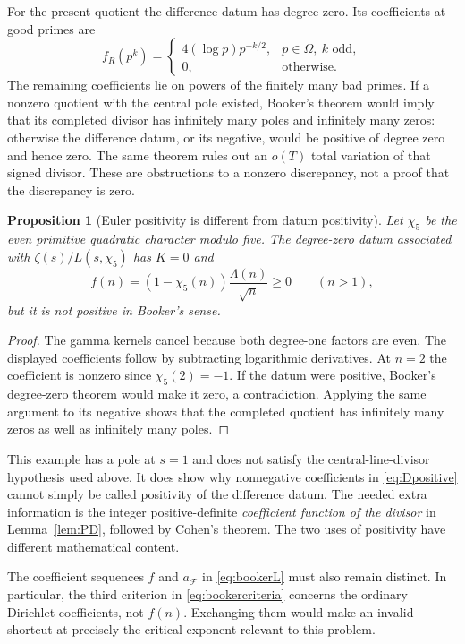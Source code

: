 \documentclass[11pt]{article}
\newtheorem{proposition}[theorem]{Proposition}
\theoremstyle{definition}
\theoremstyle{remark}
\numberwithin{equation}{section}
\begin{document}
For the present quotient the difference datum has degree zero. Its coefficients at good primes are
\[
f_R(p^k)=
\begin{cases}
4(\log p)p^{-k/2},&p\in\Omega,\ k\text{ odd},\\
0,&\text{otherwise}.
\end{cases}
\]
The remaining coefficients lie on powers of the finitely many bad primes. If a nonzero quotient with the central pole existed, Booker's theorem would imply that its completed divisor has infinitely many poles and infinitely many zeros: otherwise the difference datum, or its negative, would be positive of degree zero and hence zero. The same theorem rules out an $o(T)$ total variation of that signed divisor. These are obstructions to a nonzero discrepancy, not a proof that the discrepancy is zero.

\begin{proposition}[Euler positivity is different from datum positivity]\label{prop:counterexample}
Let $\chi_5$ be the even primitive quadratic character modulo five. The degree-zero datum associated with $\zeta(s)/L(s,\chi_5)$ has $K=0$ and
\[
f(n)=(1-\chi_5(n))\frac{\Lambda(n)}{\sqrt n}\ge0
\qquad(n>1),
\]
but it is not positive in Booker's sense.
\end{proposition}

\begin{proof}
The gamma kernels cancel because both degree-one factors are even. The displayed coefficients follow by subtracting logarithmic derivatives. At $n=2$ the coefficient is nonzero since $\chi_5(2)=-1$. If the datum were positive, Booker's degree-zero theorem would make it zero, a contradiction. Applying the same argument to its negative shows that the completed quotient has infinitely many zeros as well as infinitely many poles.
\end{proof}

This example has a pole at $s=1$ and does not satisfy the central-line-divisor hypothesis used above. It does show why nonnegative coefficients in \eqref{eq:Dpositive} cannot simply be called positivity of the difference datum. The needed extra information is the integer positive-definite \emph{coefficient function of the divisor} in Lemma~\ref{lem:PD}, followed by Cohen's theorem. The two uses of positivity have different mathematical content.

The coefficient sequences $f$ and $a_{\mathcal F}$ in \eqref{eq:bookerL} must also remain distinct. In particular, the third criterion in \eqref{eq:bookercriteria} concerns the ordinary Dirichlet coefficients, not $f(n)$. Exchanging them would make an invalid shortcut at precisely the critical exponent relevant to this problem.
\end{document}
